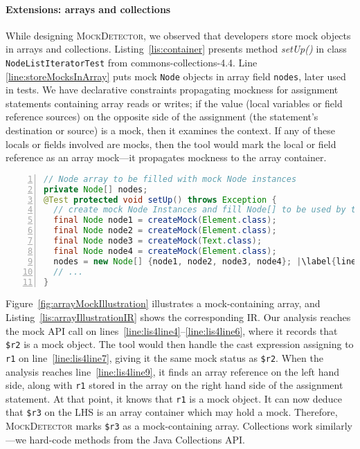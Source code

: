 \paragraph{Extensions: arrays and collections} While designing \textsc{MockDetector}, we observed that developers store mock objects in arrays and collections. Listing~\ref{lis:container} presents method \textit{setUp()} in class \texttt{NodeListIteratorTest} from commons-collections-4.4. Line \ref{line:storeMocksInArray} puts mock \texttt{Node} objects in array field \texttt{nodes}, later used in tests. We have declarative constraints propagating mockness for assignment statements containing array reads or writes; if the value (local variables or field reference sources) on the opposite side of the assignment (the statement's destination or source) is a mock, then it examines the context. If any of these locals or fields involved are mocks, then the tool would mark the local or field reference as an array mock---it propagates mockness to the array container.

\begin{lstlisting}[basicstyle=\ttfamily, caption={This example illustrates a field array container holding mock objects from \textit{setUp()} in \texttt{NodeListIteratorTest}.},
numbers=left,numbersep=2pt,basicstyle=\scriptsize\ttfamily,language = Java, framesep=4.5mm, framexleftmargin=1.0mm, captionpos=b, label=lis:container, escapechar=|, morekeywords={@Test}]
// Node array to be filled with mock Node instances
private Node[] nodes;
@Test protected void setUp() throws Exception {
  // create mock Node Instances and fill Node[] to be used by tests
  final Node node1 = createMock(Element.class);
  final Node node2 = createMock(Element.class);
  final Node node3 = createMock(Text.class);
  final Node node4 = createMock(Element.class);
  nodes = new Node[] {node1, node2, node3, node4}; |\label{line:storeMocksInArray}|
  // ...
}
\end{lstlisting}

Figure~\ref{fig:arrayMockIllustration} illustrates a mock-containing array, and Listing~\ref{lis:arrayIllustrationIR} shows the corresponding IR. Our analysis reaches the mock API call on lines~\ref{line:lis4line4}--\ref{line:lis4line6}, where it records that \texttt{\$r2} is a mock object. The tool would then handle the cast expression assigning to \texttt{r1} on line~\ref{line:lis4line7}, giving it the same mock status as \texttt{\$r2}. When the analysis reaches line~\ref{line:lis4line9}, it finds an array reference on the left hand side, along with \texttt{r1} stored in the array on the right hand side of the assignment statement. At that point, it knows that \texttt{r1} is a mock object. It can now deduce that \texttt{\$r3} on the LHS is an array container which may hold a mock. Therefore, \textsc{MockDetector} marks \texttt{\$r3} as a mock-containing array. Collections work similarly---we hard-code methods from the Java Collections API.

